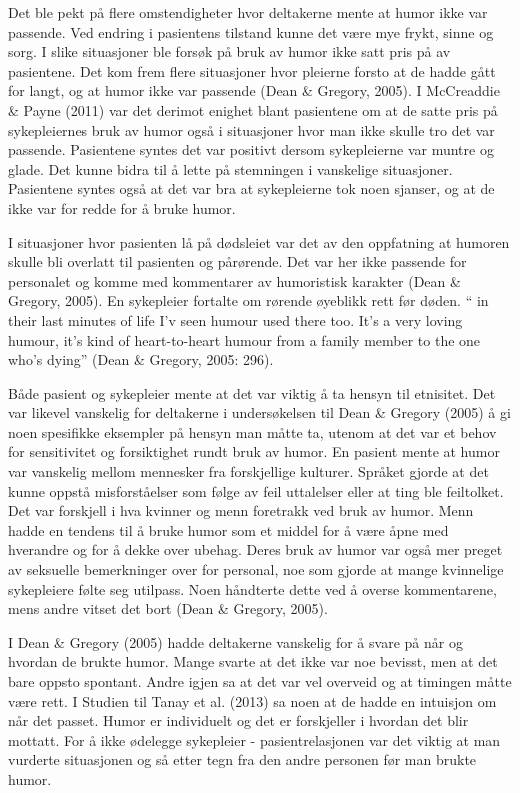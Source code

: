 Det ble pekt på flere omstendigheter hvor deltakerne mente at humor ikke var
passende. Ved endring i pasientens tilstand kunne det være mye frykt, sinne og
sorg. I slike situasjoner ble forsøk på bruk av humor ikke satt pris på av
pasientene. Det kom frem flere situasjoner hvor pleierne forsto at de hadde
gått for langt, og at humor ikke var passende (Dean \&{} Gregory, 2005). I
McCreaddie \&{} Payne (2011) var det derimot enighet blant pasientene om at de
satte pris på sykepleiernes bruk av humor også i situasjoner hvor man ikke
skulle tro det var passende. Pasientene syntes det var positivt dersom
sykepleierne var muntre og glade. Det kunne bidra til å lette på stemningen i
vanskelige situasjoner. Pasientene syntes også at det var bra at sykepleierne
tok noen sjanser, og at de ikke var for redde for å bruke humor.

I situasjoner hvor pasienten lå på dødsleiet var det av den oppfatning at
humoren skulle bli overlatt til pasienten og pårørende. Det var her ikke
passende for personalet og komme med kommentarer av humoristisk karakter (Dean
\&{} Gregory, 2005). En sykepleier fortalte om rørende øyeblikk rett før døden.  “
in their last minutes of life I’v seen humour used there too. It’s a very
loving humour, it’s kind of heart-to-heart humour from a family member to the
one who’s dying” (Dean \&{} Gregory, 2005: 296).

Både pasient og sykepleier mente at det var viktig å ta hensyn til etnisitet.
Det var likevel vanskelig for deltakerne i undersøkelsen til Dean \&{} Gregory
(2005) å gi noen spesifikke eksempler på hensyn man måtte ta, utenom at det var
et behov for sensitivitet og forsiktighet rundt bruk av humor. En pasient mente
at humor var vanskelig mellom mennesker fra forskjellige kulturer. Språket
gjorde at det kunne oppstå misforståelser som følge av feil uttalelser eller at
ting ble feiltolket.  Det var forskjell i hva kvinner og menn foretrakk ved
bruk av humor. Menn hadde en tendens til å bruke humor som et middel for å være
åpne med hverandre og for å dekke over ubehag. Deres bruk av humor var også mer
preget av seksuelle bemerkninger over for personal, noe som gjorde at mange
kvinnelige sykepleiere følte seg utilpass. Noen håndterte dette ved å overse
kommentarene, mens andre vitset det bort (Dean \&{} Gregory, 2005).

I Dean \&{} Gregory (2005) hadde deltakerne vanskelig for å svare på når og
hvordan de brukte humor. Mange svarte at det ikke var noe bevisst, men at det
bare oppsto spontant. Andre igjen sa at det var vel overveid og at timingen
måtte være rett. I Studien til Tanay et al. (2013) sa noen at de hadde en
intuisjon om når det passet. Humor er individuelt og det er forskjeller i
hvordan det blir mottatt. For å ikke ødelegge sykepleier - pasientrelasjonen
var det viktig at man vurderte situasjonen og så etter tegn fra den andre
personen før man brukte humor.

